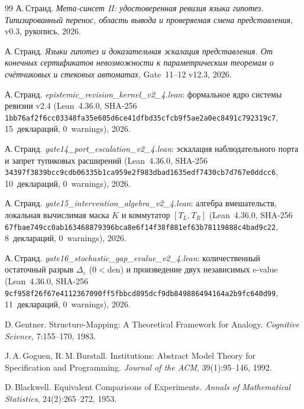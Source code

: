 \documentclass[11pt,a4paper]{article}
\theoremstyle{preprintthm}
\theoremstyle{preprintdef}
\begin{document}
\begin{thebibliography}{99}\small
{}
А.\,Странд. \emph{Мета-синсет II: удостоверенная ревизия языка гипотез. Типизированный перенос, область вывода и проверяемая смена представления}, v0.3, рукопись, 2026.

А.\,Странд. \emph{Языки гипотез и доказательная эскалация представления. От конечных сертификатов невозможности к параметрическим теоремам о счётчиковых и стековых автоматах}, Gate~11--12 v12.3, 2026.

А.\,Странд. \emph{epistemic\_\allowbreak revision\_\allowbreak kernel\_\allowbreak v2\_\allowbreak 4.lean}: формальное ядро системы ревизии v2.4 (Lean~4.36.0, SHA-256 \texttt{1bb76af2f6cc0334\allowbreak 8fa35e605d6ce41dfbd35cfcb9f5ae2a0ec8491c792319c7}, 15~деклараций, 0~warnings), 2026.

А.\,Странд. \emph{gate14\_\allowbreak port\_\allowbreak escalation\_\allowbreak v2\_\allowbreak 4.lean}: эскалация наблюдательного порта и запрет тупиковых расширений (Lean~4.36.0, SHA-256 \texttt{34397f3839bcc9cd\allowbreak b06335b1ca959e2f983dbad1635edf7430cb7d767e0ddcc6}, 10~деклараций, 0~warnings), 2026.

А.\,Странд. \emph{gate15\_\allowbreak intervention\_\allowbreak algebra\_\allowbreak v2\_\allowbreak 4.lean}: алгебра вмешательств, локальная вычислимая маска $K$ и коммутатор $[T_L,T_R]$ (Lean~4.36.0, SHA-256 \texttt{67fbae749cc0ab16\allowbreak 3468879396bca8e6f14f38f881ef63b78119888c4bad9c22}, 8~деклараций, 0~warnings), 2026.

А.\,Странд. \emph{gate16\_\allowbreak stochastic\_\allowbreak gap\_\allowbreak evalue\_\allowbreak v2\_\allowbreak 4.lean}: количественный остаточный разрыв $\Delta_\varepsilon$ ($0<\mathrm{den}$) и произведение двух независимых e-value (Lean~4.36.0, SHA-256 \texttt{9cf958f26f67e411\allowbreak 2367090ff5fbbcd895dcf9db849886494164a2b9fc640d99}, 11~деклараций, 0~warnings), 2026.

D.\,Gentner. Structure-Mapping: A Theoretical Framework for Analogy. \emph{Cognitive Science}, 7:155--170, 1983.

J.\,A.\,Goguen, R.\,M.\,Burstall. Institutions: Abstract Model Theory for Specification and Programming. \emph{Journal of the ACM}, 39(1):95--146, 1992.

D.\,Blackwell. Equivalent Comparisons of Experiments. \emph{Annals of Mathematical Statistics}, 24(2):265--272, 1953.


\end{thebibliography}
\end{document}
